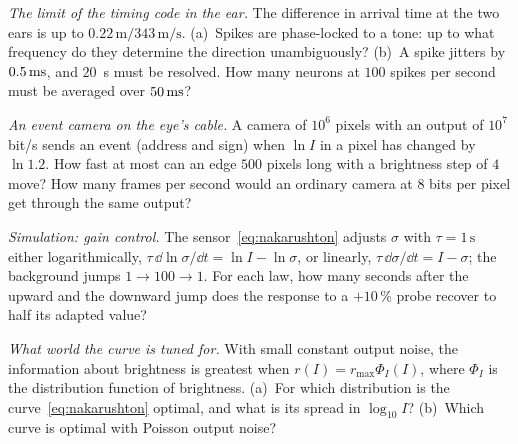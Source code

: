 \begin{exercise}[\lvlB]
\label{ex:11:4}
\emph{The limit of the timing code in the ear.} The difference in arrival time at the two ears is up to $0.22\,\text{m}/343\,\text{m/s}$. (a)~Spikes are phase-locked to a tone: up to what frequency do they determine the direction unambiguously? (b)~A spike jitters by $0.5\,\text{ms}$, and $20$~\textmu s must be resolved. How many neurons at $100$ spikes per second must be averaged over $50\,\text{ms}$?
\end{exercise}

\begin{exercise}[\lvlB]
\label{ex:11:5}
\emph{An event camera on the eye's cable.} A camera of $10^6$ pixels with an output of $10^7$ bit/s sends an event (address and sign) when $\ln I$ in a pixel has changed by $\ln1.2$. How fast at most can an edge $500$ pixels long with a brightness step of $4$ move? How many frames per second would an ordinary camera at $8$ bits per pixel get through the same output?
\end{exercise}

\begin{exercise}[\lvlB]
\label{ex:11:6}
\emph{Simulation: gain control.} The sensor~\eqref{eq:nakarushton} adjusts $\sigma$ with $\tau=1\,\text{s}$ either logarithmically, $\tau\,\dd\ln\sigma/\dd t=\ln I-\ln\sigma$, or linearly, $\tau\,\dd\sigma/\dd t=I-\sigma$; the background jumps $1\to100\to1$. For each law, how many seconds after the upward and the downward jump does the response to a $+10\,\%$ probe recover to half its adapted value?
\end{exercise}

\begin{exercise}[\lvlC]
\label{ex:11:7}
\emph{What world the curve is tuned for.} With small constant output noise, the information about brightness is greatest when $r(I)=r_{\max}\Phi_I(I)$, where $\Phi_I$ is the distribution function of brightness. (a)~For which distribution is the curve~\eqref{eq:nakarushton} optimal, and what is its spread in $\log_{10}I$? (b)~Which curve is optimal with Poisson output noise?
\end{exercise}
